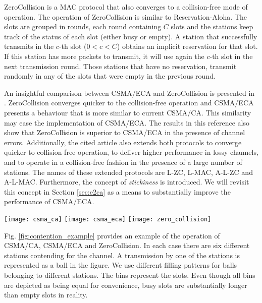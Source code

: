 \documentclass[journal]{IEEEtran}
\begin{document}
ZeroCollision \cite{lee2008daa} is a MAC protocol that also converges to a collision-free mode of operation. The operation of ZeroCollision is similar to Reservation-Aloha. The slots are grouped in rounds, each round containing $C$ slots and the stations keep track of the status of each slot (either busy or empty). A station that successfully transmits in the $c$-th slot ($0<c<C$) obtains an implicit reservation for that slot. If this station has more packets to transmit, it will use again the $c$-th slot in the next transmission round. Those stations that have no reservation, transmit randomly in any of the slots that were empty in the previous round.

An insightful comparison between CSMA/ECA and ZeroCollision is presented in \cite{fang2009dlm}. ZeroCollision converges quicker to the collision-free operation and CSMA/ECA presents a behaviour that is more similar to current CSMA/CA. This similarity may ease the implementation of CSMA/ECA. The results in this reference also show that ZeroCollision is superior to CSMA/ECA in the presence of channel errors. Additionally, the cited article also extends both protocols to converge quicker to collision-free operation, to deliver higher performance in lossy channels, and to operate in a collision-free fashion in the presence of a large number of stations. The names of these extended protocols are L-ZC, L-MAC, A-L-ZC and A-L-MAC. Furthermore, the concept of \emph{stickiness} is introduced. We will revisit this concept in Section \ref{sec:e2ca} as a means to substantially improve the performance of CSMA/ECA.

\begin{figure*}\centering
  \texttt{[image: csma\_ca]}
  \qquad
  \texttt{[image: csma\_eca]}
  \qquad
  \texttt{[image: zero\_collision]}
  \caption{An example of CSMA/CA (left), CSMA/ECA (center) and ZeroCollision (right) execution.}\label{fig:contention_example}\end{figure*}

Fig. \ref{fig:contention_example} provides an example of the operation of CSMA/CA, CSMA/ECA and ZeroCollision. In each case there are six different stations contending for the channel. A transmission by one of the stations is represented as a ball in the figure. We use different filling patterns for balls belonging to different stations. The bins represent the slots. Even though all bins are depicted as being equal for convenience, busy slots are substantially longer than empty slots in reality.
\end{document}
